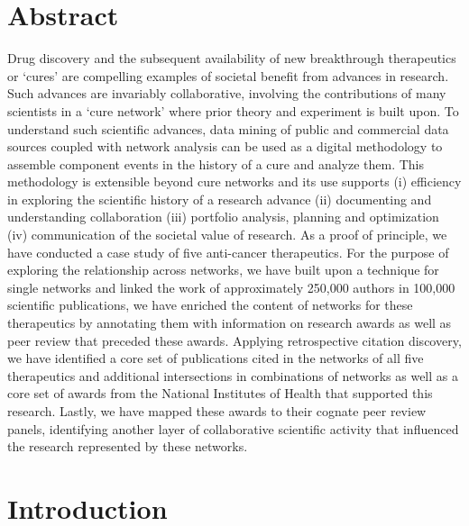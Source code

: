 \documentclass[10pt,letterpaper]{article}
\begin{document}
\section*{Abstract}

Drug discovery and the subsequent availability of new breakthrough therapeutics or `cures' are compelling examples of societal benefit from advances in research. Such advances are invariably collaborative, involving the contributions of many scientists in a `cure network' where prior theory and experiment is built upon. To understand such scientific advances, data mining of public and commercial data sources coupled with network analysis can be used as a digital methodology to assemble component events in the history of a cure and analyze them. This methodology is extensible beyond cure networks and its use supports (i) efficiency in  exploring  the scientific history of a research advance (ii) documenting and understanding collaboration (iii) portfolio analysis, planning and optimization (iv) communication of the societal value of research.  As a proof of principle, we have conducted a case study of five anti-cancer therapeutics. For the purpose of exploring the relationship across networks, we have built upon a technique for single networks and linked the work of approximately 250,000 authors in 100,000 scientific publications, we have enriched the content of networks for these therapeutics by annotating them with information on research awards as well as peer review that preceded these awards. Applying retrospective citation discovery, we have identified a core set of publications cited in the networks of all five therapeutics and additional intersections in combinations of networks as well as a core set of awards from the National Institutes of Health that supported this research. Lastly, we have mapped these awards to their cognate peer review panels, identifying another layer of collaborative scientific activity that influenced the research represented by these networks. 

\linenumbers

\section*{Introduction}
\end{document}
